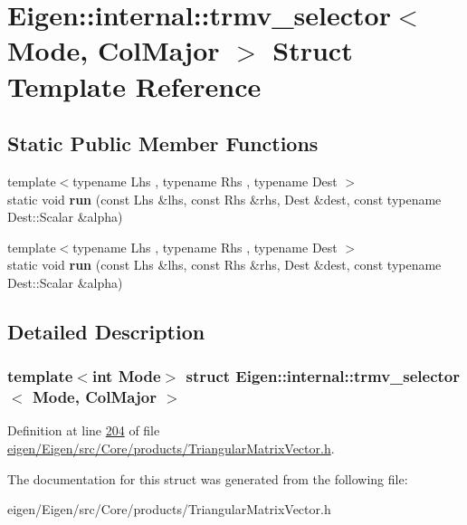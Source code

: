 \hypertarget{struct_eigen_1_1internal_1_1trmv__selector_3_01_mode_00_01_col_major_01_4}{}\section{Eigen\+:\+:internal\+:\+:trmv\+\_\+selector$<$ Mode, Col\+Major $>$ Struct Template Reference}
\label{struct_eigen_1_1internal_1_1trmv__selector_3_01_mode_00_01_col_major_01_4}
\subsection*{Static Public Member Functions}
\begin{DoxyCompactItemize}
\item 
\mbox{\label{struct_eigen_1_1internal_1_1trmv__selector_3_01_mode_00_01_col_major_01_4_a8759cece1c4d1c2ac7c77c21f3fbbfa0}} 
{\footnotesize template$<$typename Lhs , typename Rhs , typename Dest $>$ }\\static void {\bfseries run} (const Lhs \&lhs, const Rhs \&rhs, Dest \&dest, const typename Dest\+::\+Scalar \&alpha)
\item 
\mbox{\label{struct_eigen_1_1internal_1_1trmv__selector_3_01_mode_00_01_col_major_01_4_a8759cece1c4d1c2ac7c77c21f3fbbfa0}} 
{\footnotesize template$<$typename Lhs , typename Rhs , typename Dest $>$ }\\static void {\bfseries run} (const Lhs \&lhs, const Rhs \&rhs, Dest \&dest, const typename Dest\+::\+Scalar \&alpha)
\end{DoxyCompactItemize}


\subsection{Detailed Description}
\subsubsection*{template$<$int Mode$>$\newline
struct Eigen\+::internal\+::trmv\+\_\+selector$<$ Mode, Col\+Major $>$}



Definition at line \hyperlink{eigen_2_eigen_2src_2_core_2products_2_triangular_matrix_vector_8h_source_l00204}{204} of file \hyperlink{eigen_2_eigen_2src_2_core_2products_2_triangular_matrix_vector_8h_source}{eigen/\+Eigen/src/\+Core/products/\+Triangular\+Matrix\+Vector.\+h}.



The documentation for this struct was generated from the following file\+:\begin{DoxyCompactItemize}
\item 
eigen/\+Eigen/src/\+Core/products/\+Triangular\+Matrix\+Vector.\+h\end{DoxyCompactItemize}
